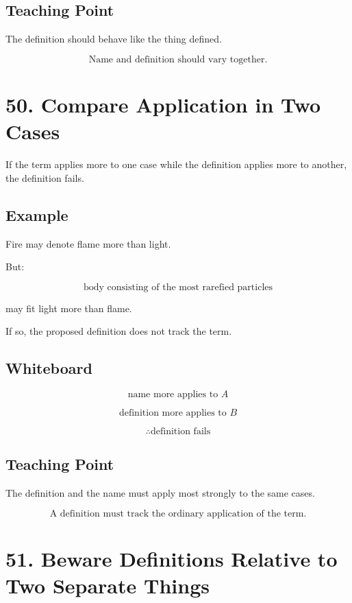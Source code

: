 \documentclass[12pt]{article}
\begin{document}
\subsection*{Teaching Point}

The definition should behave like the thing defined.

\[
\boxed{
\text{Name and definition should vary together.}
}
\]

\section*{50. Compare Application in Two Cases}

If the term applies more to one case while the definition applies more to
another, the definition fails.

\subsection*{Example}

Fire may denote flame more than light.

But:

\[
\text{body consisting of the most rarefied particles}
\]

may fit light more than flame.

If so, the proposed definition does not track the term.

\subsection*{Whiteboard}

\[
\text{name more applies to } A
\]

\[
\text{definition more applies to } B
\]

\[
\therefore \text{definition fails}
\]

\subsection*{Teaching Point}

The definition and the name must apply most strongly to the same cases.

\[
\boxed{
\text{A definition must track the ordinary application of the term.}
}
\]

\section*{51. Beware Definitions Relative to Two Separate Things}
\end{document}
